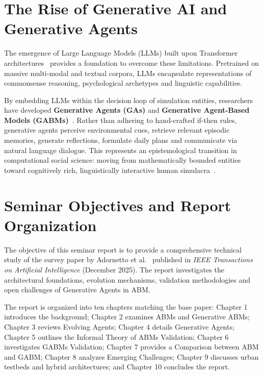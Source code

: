 \documentclass[12pt,a4paper]{report}
\begin{document}
\section{The Rise of Generative AI and Generative Agents}
\label{sec:genai_shift}

The emergence of Large Language Models (LLMs) built upon Transformer architectures~\cite{vaswani2017attention} provides a foundation to overcome these limitations. Pretrained on massive multi-modal and textual corpora, LLMs encapsulate representations of commonsense reasoning, psychological archetypes and linguistic capabilities.

By embedding LLMs within the decision loop of simulation entities, researchers have developed \textbf{Generative Agents (GAs)} and \textbf{Generative Agent-Based Models (GABMs)}~\cite{adornetto2025generative}. Rather than adhering to hand-crafted if-then rules, generative agents perceive environmental cues, retrieve relevant episodic memories, generate reflections, formulate daily plans and communicate via natural language dialogue. This represents an epistemological transition in computational social science: moving from mathematically bounded entities toward cognitively rich, linguistically interactive human simulacra~\cite{park2023generative}.

\section{Seminar Objectives and Report Organization}
\label{sec:report_objectives}

The objective of this seminar report is to provide a comprehensive technical study of the survey paper by Adornetto et al.~\cite{adornetto2025generative} published in \textit{IEEE Transactions on Artificial Intelligence} (December 2025). The report investigates the architectural foundations, evolution mechanisms, validation methodologies and open challenges of Generative Agents in ABM.

The report is organized into ten chapters matching the base paper: Chapter 1 introduces the background; Chapter 2 examines ABMs and Generative ABMs; Chapter 3 reviews Evolving Agents; Chapter 4 details Generative Agents; Chapter 5 outlines the Informal Theory of ABMs Validation; Chapter 6 investigates GABMs Validation; Chapter 7 provides a Comparison between ABM and GABM; Chapter 8 analyzes Emerging Challenges; Chapter 9 discusses urban testbeds and hybrid architectures; and Chapter 10 concludes the report.
\end{document}
